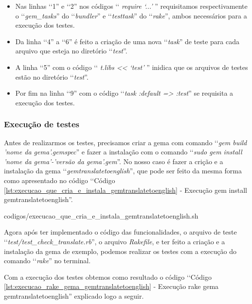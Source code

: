 \begin{itemize}

\item Nas linhas ‘‘1'' e ‘‘2'' nos códigos ‘‘ \emph{require ‘...'} '' requisitamos respectivamente o 
 ‘‘\emph{gem\_tasks}'' do ‘‘\emph{bundler}'' e ‘‘\emph{testtask}'' do ‘‘\emph{rake}'', ambos necessários para
 a execução dos testes.
 
 \item Da linha ‘‘4'' a ‘‘6'' é feito a criação de uma nova ‘‘\emph{task}'' de teste para cada arquivo 
 que esteja no diretório ‘‘\emph{test}''.
 
 \item A linha ‘‘5'' com o código ‘‘ \emph{t.libs << ‘test'} '' inidica que os arquivos de testes estão no 
 diretório ‘‘\emph{test}''.

 \item Por fim na linha ‘‘9'' com o código ‘‘\emph{task :default => :test}'' se requisita a execução 
 dos testes.
 
\end{itemize}

\subsubsection{Execução de testes}
\label{subsubsection:execução_de_testes}

Antes de realizarmos os testes, precisamos criar a gema com comando ‘‘\emph{gem build 'nome da gema'.gemspec}'' 
e fazer a instalação com o comando ‘‘\emph{sudo gem install 'nome da gema'-'versão da gema'.gem}''. No nosso 
caso é fazer a crição e a instalação da gema ‘‘\emph{gemtranslatetoenglish}'', que pode ser feito da mesma 
forma como apresentado no código ‘‘Código \ref{lst:execucao_que_cria_e_instala_gemtranslatetoenglish} - Execução 
gem install gemtranslatetoenglish''.


{codigos/execucao_que_cria_e_instala_gemtranslatetoenglish.sh }

Agora após ter implementado o código das funcionalidades, o arquivo de teste 
‘‘\emph{test/test\_check\_translate.rb}'', o arquivo \emph{Rakefile}, e ter feito a criação e a instalação 
da gema de exemplo, podemos realizar os testes com a execução do comando ‘‘\emph{rake}'' no terminal. 

Com a execução dos testes obtemos como resultado o código ‘‘Código 
\ref{lst:execucao_rake_gema_gemtranslatetoenglish} - Execução rake gema gemtranslatetoenglish'' explicado 
logo a seguir.

